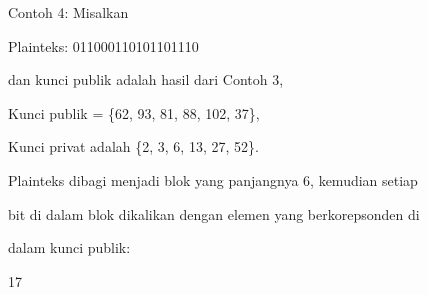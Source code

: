 \documentclass{article}
\begin{document}

Contoh 4:  Misalkan 



Plainteks: 011000110101101110


 dan kunci publik adalah hasil dari Contoh 3,



Kunci publik = \{62, 93, 81, 88, 102, 37\},  


Kunci privat adalah \{2, 3, 6, 13, 27, 52\}.

 Plainteks dibagi menjadi blok yang panjangnya 6, kemudian setiap 

bit di dalam blok dikalikan dengan elemen yang berkorepsonden di 

dalam kunci publik:

17
\end{document}
